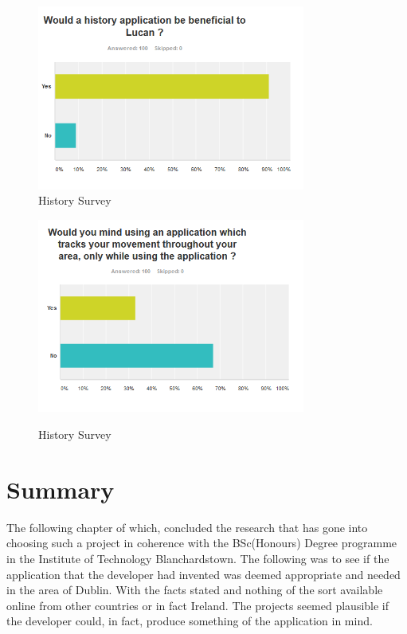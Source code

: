 \begin{figure}[!tbp]
    \centering
    \begin{minipage}[b]{0.4\textwidth}
        \includegraphics[width=250pt]{Survey3}\\
        \caption{History Survey} 
        \label{Figure: History Survey}
    \end{minipage}
    \hfill
    \begin{minipage}[b]{0.4\textwidth}
            \includegraphics[width=250pt]{Survey4}\\
            \caption{History Survey} 
            \label{Figure: History Survey}
    \end{minipage}
\end{figure}
\newpage
\section{Summary}
The following chapter of which, concluded the research that has gone into choosing such a project in coherence with the BSc(Honours) Degree programme in the Institute of Technology Blanchardstown. The following was to see if the application that the developer had invented was deemed appropriate and needed in the area of Dublin. With the facts stated and nothing of the sort available online from other countries or in fact Ireland. The projects seemed plausible if the developer could, in fact, produce something of the application in mind.



